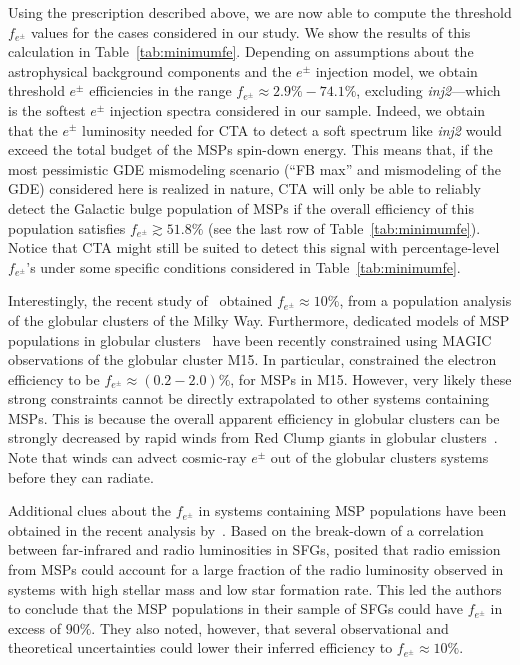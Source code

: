 \documentclass[doublespace,nopageskip]{VTthesis} %
\begin{document}
Using the prescription described above, we are now able to compute the threshold $f_{e^\pm}$ values for the cases considered in our study. We show the results of this calculation in Table~\ref{tab:minimumfe}. Depending on assumptions about the astrophysical background components and the $e^\pm$ injection model, we obtain threshold $e^\pm$ efficiencies in the range $f_{e^\pm}\approx 2.9\%-74.1\%$, excluding \textit{inj2}---which is the softest $e^\pm$ injection spectra considered in our sample. Indeed, we obtain that the $e^\pm$ luminosity needed for CTA to detect a soft spectrum like \textit{inj2} would exceed the total budget of the MSPs spin-down energy. This means that, if the most pessimistic GDE mismodeling scenario (``FB max'' and mismodeling of the GDE) considered here is realized in nature,
CTA will only be able to reliably detect the Galactic bulge population of MSPs if the overall efficiency of this population satisfies $f_{e^\pm}\gtrsim 51.8\%$ (see the last row of Table~\ref{tab:minimumfe}). Notice that CTA might still be suited to detect this signal with percentage-level $f_{e^\pm}$'s under some specific conditions considered in Table~\ref{tab:minimumfe}.

Interestingly, the recent study of~\citet{Song:2021zrs} obtained $f_{e^\pm}\approx 10\%$, from a population analysis of the globular clusters of the Milky Way. Furthermore, dedicated models of MSP populations in globular clusters~\citep{Bednarek:2016gpp,Ndiyavala:2017hoh} have been recently constrained using MAGIC observations of the globular cluster M15. In particular, \cite{Acciari:2019ysf} constrained the electron efficiency to be $f_{e^{\pm}}\approx (0.2-2.0)\%$, for MSPs in M15. However, very likely these strong constraints cannot be directly extrapolated to other systems containing MSPs. This is because the overall apparent efficiency in globular clusters can be strongly decreased by rapid winds from Red Clump giants in globular clusters~\citep{Bednarek:2016gpp}. Note that winds can advect cosmic-ray $e^\pm$ out of the globular clusters systems before they can radiate.

Additional clues about the $f_{e^{\pm}}$ in systems containing MSP populations have been obtained in the recent analysis by~\citet{Sudoh:2020hyu}. 
%
Based on the break-down of a correlation 
between far-infrared and radio luminosities in SFGs, \citet{Sudoh:2020hyu} posited that radio emission from MSPs could account for a large fraction of the radio luminosity observed in systems with high stellar mass and low star formation rate. This led the authors to conclude that the MSP populations in their sample of SFGs could have $f_{e^{\pm}}$ in excess of $90\%$. They also noted, however, that several observational and theoretical uncertainties could lower their inferred efficiency to $f_{e^{\pm}}\approx 10\%$. 
\end{document}
